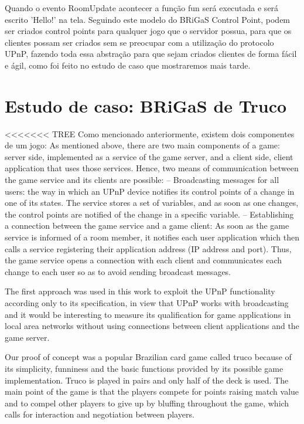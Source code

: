 \documentclass[a4paper]{sbgames}               %
\begin{document}
Quando o evento RoomUpdate acontecer a função fun será executada e será escrito 'Hello!' na tela.
Seguindo este modelo do BRiGaS Control Point, podem ser criados control points para qualquer jogo que o servidor possua, para que os clientes possam ser criados sem se preocupar com a utilização do protocolo UPnP, fazendo toda essa abstração para que sejam criados clientes de forma fácil e ágil, como foi feito no estudo de caso que mostraremos mais tarde.

\section{Estudo de caso: BRiGaS de Truco}

<<<<<<< TREE
Como mencionado anteriormente, existem dois componentes de um jogo: 
As mentioned above, there are two main components of a game: server side, implemented as a service of the game server, and a client side, client application that uses those services.  Hence, two means of communication between the game service and its clients are possible:
-- Broadcasting messages for all users:  the way in which an UPnP device notifies its control points of a change in one of its states. The service stores a set of variables, and as soon as one changes, the control points are notified of the change in a specific variable.
-- Establishing a connection between the game service and a game client: As soon as the game service is informed of a room member, it notifies each user application which then calls a service registering their application address (IP address and port). Thus, the game service opens a connection with each client and communicates each change to each user so as to avoid sending broadcast messages.

The first approach was used in this work to exploit the UPnP functionality according only to its specification, in view that UPnP works with broadcasting and it would be interesting to measure its qualification for game applications in local area networks without using connections between client applications and the game server.

Our proof of concept was a popular Brazilian card game called truco because of its simplicity, funniness and the basic functions provided by its possible game implementation. Truco is played in pairs and only half of the deck is used. The main point of the game is that the players compete for points raising match value and to compel other players to give up by bluffing throughout the game, which calls for interaction and negotiation between players.
\end{document}
